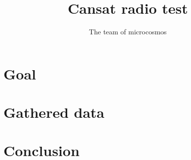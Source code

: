 \documentclass[english,12pt,a4paper]{article}
\title{Cansat radio test}
\author{The team of microcosmos}
\begin{document}
	\maketitle
	\section{Goal}
	\section{Gathered data}
	\section{Conclusion}
\end{document}
